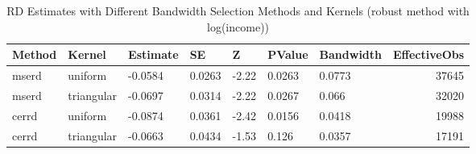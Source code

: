\begin{table}[ht]
\centering
\begin{tabular}{lllllllr}
  \hline
Method & Kernel & Estimate & SE & Z & PValue & Bandwidth & EffectiveObs \\ 
  \hline
mserd & uniform & -0.0584 & 0.0263 & -2.22 & 0.0263 & 0.0773 & 37645 \\ 
  mserd & triangular & -0.0697 & 0.0314 & -2.22 & 0.0267 & 0.066 & 32020 \\ 
  cerrd & uniform & -0.0874 & 0.0361 & -2.42 & 0.0156 & 0.0418 & 19988 \\ 
  cerrd & triangular & -0.0663 & 0.0434 & -1.53 & 0.126 & 0.0357 & 17191 \\ 
   \hline
\end{tabular}
\caption{RD Estimates with Different Bandwidth Selection Methods and Kernels (robust method with log(income))} 
\label{tab:rd_bandwidth_kernel_results_robust}
\end{table}

